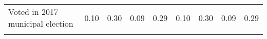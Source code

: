 \begin{table}
{\begin{tabular}[t]{lrrrrrrrr}
Voted in 2017 municipal election & 0.10 & 0.30 & 0.09 & 0.29 & 0.10 & 0.30 & 0.09 & 0.29\\
\cellcolor[HTML]{D3D3D3}{Voted in 2016 general election} & \cellcolor[HTML]{D3D3D3}{0.45} & \cellcolor[HTML]{D3D3D3}{0.50} & \cellcolor[HTML]{D3D3D3}{0.45} & \cellcolor[HTML]{D3D3D3}{0.50} & \cellcolor[HTML]{D3D3D3}{0.45} & \cellcolor[HTML]{D3D3D3}{0.50} & \cellcolor[HTML]{D3D3D3}{0.43} & \cellcolor[HTML]{D3D3D3}{0.50}\\
\bottomrule
\end{tabular}}
\end{table}
